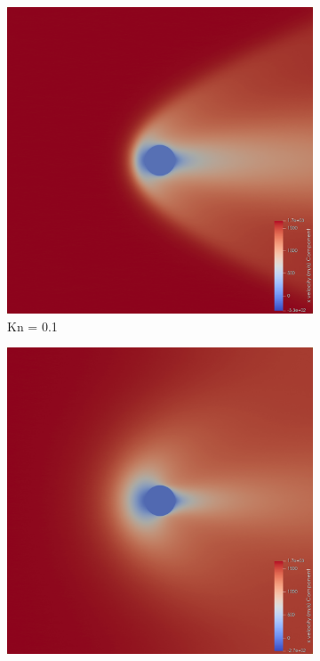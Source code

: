 \begin{figure}
    \centering
    \begin{subfigure}{0.32\textwidth}
        \centering
        \includegraphics[width=\textwidth]{Images/4. Results/Circle Kn/pv/Kn0.1.png}
        \caption{Kn = 0.1}
    \end{subfigure}
    \hfill
    \begin{subfigure}{0.32\textwidth}
        \centering
        \includegraphics[width=\textwidth]{Images/4. Results/Circle Kn/pv/Kn0.5.png}

\end{subfigure}
\end{figure}
